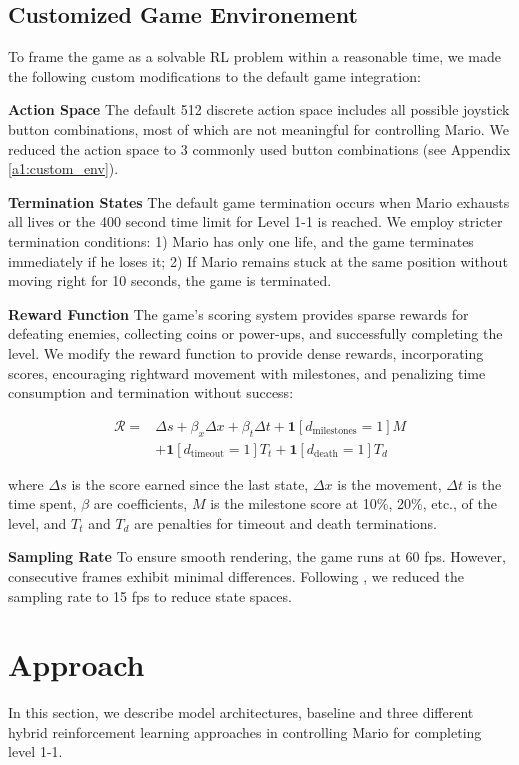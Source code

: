 \documentclass{article}
\begin{document}
\subsection{Customized Game Environement}

To frame the game as a solvable RL problem within a reasonable time, we made 
the following custom modifications to the default game integration:

\textbf{Action Space} 
The default 512 discrete action space includes all possible joystick button 
combinations, most of which are not meaningful for controlling Mario. We 
reduced the action space to 3 commonly used button combinations (see 
Appendix \ref{a1:custom_env}).

\textbf{Termination States}
The default game termination occurs when Mario exhausts all lives or the 400 
second time limit for Level 1-1 is reached. We employ stricter termination 
conditions: 1) Mario has only one life, and the game terminates immediately if 
he loses it; 2) If Mario remains stuck at the same position without moving 
right for 10 seconds, the game is terminated.

\textbf{Reward Function}
\label{sec:reward}
The game's scoring system provides sparse rewards for defeating enemies, 
collecting coins or power-ups, and successfully completing the level.
We modify the reward function to provide dense rewards, incorporating scores, 
encouraging rightward movement with milestones, and penalizing time consumption 
and termination without success:

\begin{align*}
      \mathcal{R} = &\Delta s + \beta_x \Delta x + \beta_t \Delta t + \mathbf{1}[d_{\text{milestones}} = 1] M\\
      & + \mathbf{1}[d_{\text{timeout}} = 1] T_t + \mathbf{1}[d_{\text{death}} = 1] T_d
\end{align*}

where $\Delta s$ is the score earned since the last state, $\Delta x$ is the 
movement, $\Delta t$ is the time spent, $\beta$ are coefficients, $M$ is the 
milestone score at 10\%, 20\%, etc., of the level, and $T_t$ and $T_d$ are 
penalties for timeout and death terminations.

\textbf{Sampling Rate}
To ensure smooth rendering, the game runs at 60 fps. However, consecutive 
frames exhibit minimal differences. Following \cite{feng2024mario}, 
we reduced the sampling rate to 15 fps to reduce state spaces.


\section{Approach}
In this section, we describe 
model architectures,
baseline and three different hybrid reinforcement 
learning approaches in controlling Mario for completing level 1-1.
\end{document}
